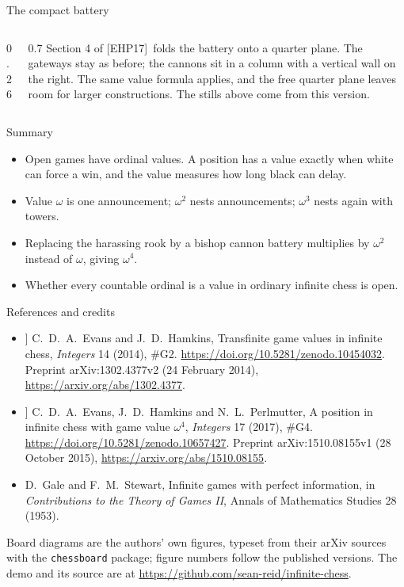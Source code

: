 \documentclass[aspectratio=169,10pt]{beamer}
\newcommand{\EH}{[EH14]}
\newcommand{\EHP}{[EHP17]}
\begin{document}
\begin{frame}{The compact battery}
  \begin{columns}[T]
    \begin{column}{0.26\textwidth}
      \credit{Figure 6 of \EHP.}
    \end{column}
    \begin{column}{0.7\textwidth}
      Section 4 of \EHP\ folds the battery onto a quarter plane. The gateways stay as before; the cannons
      sit in a column with a vertical wall on the right. The same value formula applies, and the free quarter
      plane leaves room for larger constructions. The stills above come from this version.
    \end{column}
  \end{columns}
\end{frame}

\begin{frame}{Summary}
  \begin{itemize}
    \item Open games have ordinal values. A position has a value exactly when white can force a win, and
      the value measures how long black can delay. 
    \item Value $\omega$ is one announcement; $\omega^2$ nests announcements; $\omega^3$ nests again with
      towers. \flag{sketched from \EH}
    \item Replacing the harassing rook by a bishop cannon battery multiplies by $\omega^2$ instead of
      $\omega$, giving $\omega^4$. \flag{sketched from \EHP}
    \item Whether every countable ordinal is a value in ordinary infinite chess is open. 
  \end{itemize}
\end{frame}

\begin{frame}{References and credits}
  \scriptsize
  \begin{itemize}
    \item[\EH] C.~D.~A.~Evans and J.~D.~Hamkins, Transfinite game values in infinite chess,
      \emph{Integers} 14 (2014), \#G2. \url{https://doi.org/10.5281/zenodo.10454032}.
      Preprint arXiv:1302.4377v2 (24 February 2014), \url{https://arxiv.org/abs/1302.4377}.
    \item[\EHP] C.~D.~A.~Evans, J.~D.~Hamkins and N.~L.~Perlmutter, A position in infinite chess with
      game value $\omega^4$, \emph{Integers} 17 (2017), \#G4. \url{https://doi.org/10.5281/zenodo.10657427}.
      Preprint arXiv:1510.08155v1 (28 October 2015), \url{https://arxiv.org/abs/1510.08155}.
    \item[GS] D.~Gale and F.~M.~Stewart, Infinite games with perfect information, in
      \emph{Contributions to the Theory of Games II}, Annals of Mathematics Studies 28 (1953).
  \end{itemize}
  \vskip 0.3cm
  Board diagrams are the authors' own figures, typeset from their arXiv sources with the
  \texttt{chessboard} package; figure numbers follow the published versions.
  The demo and its source are at \url{https://github.com/sean-reid/infinite-chess}.
\end{frame}
\end{document}
